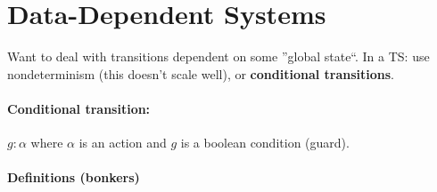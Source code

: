 \documentclass{article}
\begin{document}
\section{Data-Dependent Systems}
Want to deal with transitions dependent on some ''global state``.
In a TS: use nondeterminism (this doesn't scale well), or \textbf{conditional transitions}.

\paragraph{Conditional transition:} $g:\alpha$ where $\alpha$ is an action and
$g$ is a boolean condition (guard).

\paragraph{Definitions (bonkers)}
\end{document}
